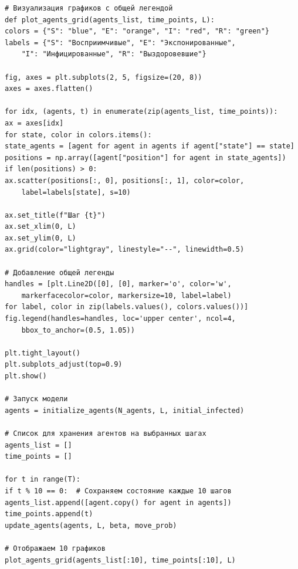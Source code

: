 \documentclass[a4paper, 14pt]{extreport}
\numberwithin{equation}{section}
\begin{document}
\begin{verbatim}
# Визуализация графиков с общей легендой
def plot_agents_grid(agents_list, time_points, L):
colors = {"S": "blue", "E": "orange", "I": "red", "R": "green"}
labels = {"S": "Восприимчивые", "E": "Экспонированные", 
	"I": "Инфицированные", "R": "Выздоровевшие"}

fig, axes = plt.subplots(2, 5, figsize=(20, 8))
axes = axes.flatten()

for idx, (agents, t) in enumerate(zip(agents_list, time_points)):
ax = axes[idx]
for state, color in colors.items():
state_agents = [agent for agent in agents if agent["state"] == state]
positions = np.array([agent["position"] for agent in state_agents])
if len(positions) > 0:
ax.scatter(positions[:, 0], positions[:, 1], color=color, 
	label=labels[state], s=10)

ax.set_title(f"Шаг {t}")
ax.set_xlim(0, L)
ax.set_ylim(0, L)
ax.grid(color="lightgray", linestyle="--", linewidth=0.5)

# Добавление общей легенды
handles = [plt.Line2D([0], [0], marker='o', color='w', 
	markerfacecolor=color, markersize=10, label=label) 
for label, color in zip(labels.values(), colors.values())]
fig.legend(handles=handles, loc='upper center', ncol=4, 
	bbox_to_anchor=(0.5, 1.05))

plt.tight_layout()
plt.subplots_adjust(top=0.9) 
plt.show()

# Запуск модели
agents = initialize_agents(N_agents, L, initial_infected)

# Список для хранения агентов на выбранных шагах
agents_list = []
time_points = []

for t in range(T):
if t % 10 == 0:  # Сохраняем состояние каждые 10 шагов
agents_list.append([agent.copy() for agent in agents])  
time_points.append(t)
update_agents(agents, L, beta, move_prob)

# Отображаем 10 графиков
plot_agents_grid(agents_list[:10], time_points[:10], L)
\end{verbatim}
\end{document}
